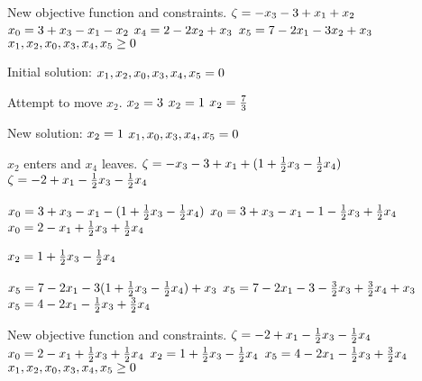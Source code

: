 \documentclass[17pt]{extarticle}
\begin{document}
\bigskip New objective function and constraints.
$\\ \zeta = -x_3 - 3 + x_1 + x_2$
$\\ x_0 = 3 + x_3 - x_1 - x_2$
$\\ x_4 = 2 - 2x_2 + x_3$
$\\ x_5 = 7 - 2x_1 - 3x_2 + x_3$
$\\ x_1, x_2, x_0, x_3, x_4, x_5 \geq 0$

\bigskip Initial solution:
$\\ x_1, x_2, x_0, x_3, x_4, x_5 = 0$

\bigskip Attempt to move $x_2$.
$\\ x_2 = 3$
$\\ x_2 = 1$
$\\ x_2 = \frac{7}{3}$

\bigskip New solution:
$\\ x_2 = 1$
$\\ x_1, x_0, x_3, x_4, x_5 = 0$

\bigskip $x_2$ enters and $x_4$ leaves.
$\\ \zeta = -x_3 - 3 + x_1 + (1 + \frac{1}{2}x_3 - \frac{1}{2}x_4)$
$\\ \zeta = - 2 + x_1 - \frac{1}{2}x_3 - \frac{1}{2}x_4$

$\\ x_0 = 3 + x_3 - x_1 - (1 + \frac{1}{2}x_3 - \frac{1}{2}x_4)$
$\\ x_0 = 3 + x_3 - x_1 - 1 - \frac{1}{2}x_3 + \frac{1}{2}x_4$
$\\ x_0 = 2 - x_1 + \frac{1}{2}x_3 + \frac{1}{2}x_4$

$\\ x_2 = 1 + \frac{1}{2}x_3 - \frac{1}{2}x_4$

$\\ x_5 = 7 - 2x_1 - 3(1 + \frac{1}{2}x_3 - \frac{1}{2}x_4) + x_3$
$\\ x_5 = 7 - 2x_1 - 3 - \frac{3}{2}x_3 + \frac{3}{2}x_4 + x_3$
$\\ x_5 = 4 - 2x_1 - \frac{1}{2}x_3 + \frac{3}{2}x_4$

\bigskip New objective function and constraints.
$\\ \zeta = - 2 + x_1 - \frac{1}{2}x_3 - \frac{1}{2}x_4$
$\\ x_0 = 2 - x_1 + \frac{1}{2}x_3 + \frac{1}{2}x_4$
$\\ x_2 = 1 + \frac{1}{2}x_3 - \frac{1}{2}x_4$
$\\ x_5 = 4 - 2x_1 - \frac{1}{2}x_3 + \frac{3}{2}x_4$
$\\ x_1, x_2, x_0, x_3, x_4, x_5 \geq 0$
\end{document}
